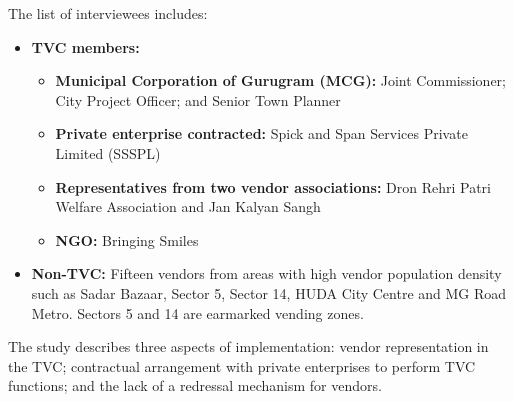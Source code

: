\documentclass[a4paper, 12pt, twoside, table]{article}
\begin{document}
{The list of interviewees includes:

\begin{itemize}
\item \textbf{TVC members:}
	\begin{itemize}
	\item \textbf{Municipal Corporation of Gurugram (MCG):} Joint Commissioner; City Project Officer; and Senior Town Planner
	\item \textbf{Private enterprise contracted:} Spick and Span Services Private Limited (SSSPL)
	\item \textbf{Representatives from two vendor associations:} Dron Rehri Patri Welfare Association and Jan Kalyan Sangh
	\item \textbf{NGO:} Bringing Smiles
	\end{itemize}
\item \textbf{Non-TVC:} Fifteen vendors from areas with high vendor population density such as Sadar Bazaar, Sector 5, Sector 14, HUDA City Centre and MG Road Metro. Sectors 5 and 14 are earmarked vending zones.
\end{itemize}

The study describes three aspects of implementation: vendor representation in the TVC; contractual arrangement with private enterprises to perform TVC functions; and the lack of a redressal mechanism for vendors.

}
\end{document}
